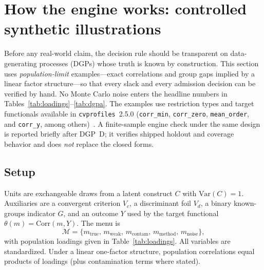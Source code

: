 \documentclass[10pt,letterpaper]{article}
\newcommand{\cvp}{\texttt{cvprofiles}}
\newcommand{\M}{\ensuremath{\mathcal{M}}}
\begin{document}
\section{How the engine works: controlled synthetic illustrations}
\label{sec:dgp}
Before any real-world claim, the decision rule should be transparent on data-generating processes (DGPs) whose truth is known by construction.
This section uses \emph{population-limit} examples---exact correlations and group gaps implied by a linear factor structure---so that every slack and every admission decision can be verified by hand.
No Monte Carlo noise enters the headline numbers in Tables~\ref{tab:loadings}--\ref{tab:dgpa}.
The examples use restriction types and target functionals available in \cvp{}~2.5.0 (\texttt{corr\_min}, \texttt{corr\_zero}, \texttt{mean\_order}, and \texttt{corr\_y}, among others)~\cite{cvprofiles}.
A finite-sample engine check under the same design is reported briefly after DGP~D; it verifies shipped holdout and coverage behavior and does \emph{not} replace the closed forms.

\subsection{Setup}
Units are exchangeable draws from a latent construct $C$ with $\mathrm{Var}(C)=1$.
Auxiliaries are a convergent criterion $V_{\!c}$, a discriminant foil $V_{\!d}$, a binary known-groups indicator $G$, and an outcome $Y$ used by the target functional $\theta(m)=\mathrm{Corr}(m,Y)$.
The menu is
\begin{equation}
\M=\bigl\{m_{\mathrm{true}},\, m_{\mathrm{weak}},\, m_{\mathrm{contam}},\, m_{\mathrm{method}},\, m_{\mathrm{noise}}\bigr\},
\label{eq:synthmenu}
\end{equation}
with population loadings given in Table~\ref{tab:loadings}.
All variables are standardized.
Under a linear one-factor structure, population correlations equal products of loadings (plus contamination terms where stated).
\end{document}
